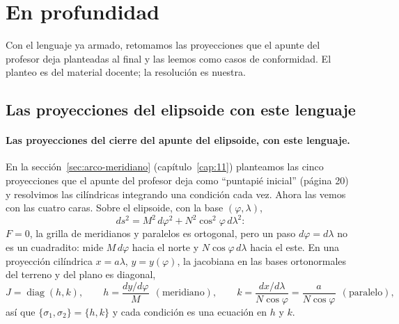 \section{En profundidad}

Con el lenguaje ya armado, retomamos las proyecciones que el apunte del profesor deja planteadas al final y las leemos como casos de conformidad. El planteo es del material docente; la resolución es nuestra.

\subsection{Las proyecciones del elipsoide con este lenguaje}\label{sec:conformes-elipsoide}

\paragraph{Las proyecciones del cierre del apunte del elipsoide, con este lenguaje.} En
la sección~\ref{sec:arco-meridiano} (capítulo~\ref{cap:11}) planteamos las cinco proyecciones que el apunte del
profesor deja como ``puntapié inicial'' (página 20) y resolvimos las cilíndricas
integrando una condición cada vez. Ahora las vemos con las cuatro caras. Sobre el
elipsoide, con la base \((\varphi,\lambda)\),
\[
  ds^2=M^2\,d\varphi^2+N^2\cos^2\varphi\,d\lambda^2 :
\]
\(F=0\), la grilla de meridianos y paralelos es ortogonal, pero un paso \(d\varphi=d\lambda\)
no es un cuadradito: mide \(M\,d\varphi\) hacia el norte y \(N\cos\varphi\,d\lambda\) hacia
el este. En una proyección cilíndrica \(x=a\lambda\), \(y=y(\varphi)\), la jacobiana en las
bases ortonormales del terreno y del plano es diagonal,
\[
  J=\operatorname{diag}(h,k),\qquad
  h=\frac{dy/d\varphi}{M}\ \ (\text{meridiano}),\qquad
  k=\frac{dx/d\lambda}{N\cos\varphi}=\frac{a}{N\cos\varphi}\ \ (\text{paralelo}),
\]
así que \(\{\sigma_1,\sigma_2\}=\{h,k\}\) y cada condición es una ecuación en \(h\) y \(k\).
